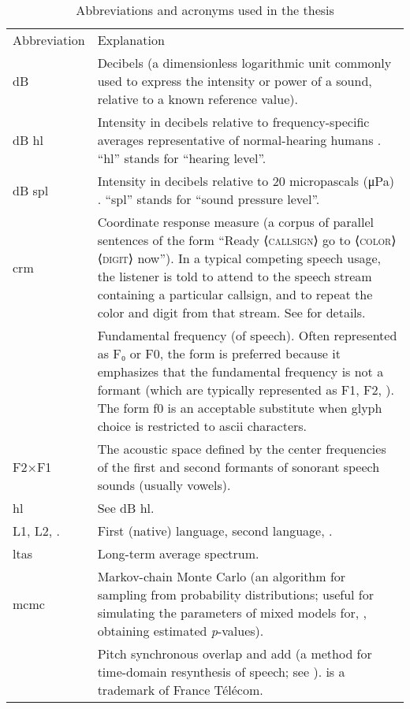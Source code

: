 \begin{table}
	\caption[Abbreviations and acronyms]{Abbreviations and acronyms used in the thesis \label{tab:Abbr}}
	\centering
	\begin{tabu} to \textwidth [c]{X[c m] X[5 m]}
		\toprule
		\everyrow{\midrule}
		\rowfont[c]{\bfseries} Abbreviation & Explanation\\
		{dB} & Decibels (a dimensionless logarithmic unit commonly used to express the intensity or power of a sound, relative to a known reference value).\\ 
		{dB \ac{hl}} & Intensity in decibels relative to frequency-specific averages representative of normal-hearing humans .  “\ac{hl}” stands for “hearing level”.\\
		{dB \ac{spl}} & Intensity in decibels relative to 20 micropascals (μPa) .  “\ac{spl}” stands for “sound pressure level”.\\
		\ac{crm} & Coordinate response measure (a corpus of parallel sentences of the form “Ready ⟨\textsc{callsign}⟩ go to ⟨\textsc{color}⟩ ⟨\textsc{digit}⟩ now”).  In a typical competing speech usage, the listener is told to attend to the speech stream containing a particular callsign, and to repeat the color and digit from that stream.  See \citet{BoliaEtAl2000} for details.\\
		\fo & Fundamental frequency (of speech).  Often represented as F₀ or F0, the form \fo{} is preferred because it emphasizes that the fundamental frequency is not a formant (which are typically represented as F1, F2, \etc).  The form f0 is an acceptable substitute when glyph choice is restricted to \ac{ascii} characters.\\
		F2×F1 & The acoustic space defined by the center frequencies of the first and second formants of sonorant speech sounds (usually vowels).\\
		\ac{hl} & See {dB \ac{hl}}.\\
		L1, L2, \etc. & First (native) language, second language, \etc.\\
		\ac{ltas} & Long-term average spectrum.\\
		\ac{mcmc} & Markov-chain Monte Carlo (an algorithm for sampling from probability distributions; useful for simulating the parameters of mixed models for, \eg, obtaining estimated \textit{p}-values).\\
		\psola & Pitch synchronous overlap and add (a method for time-domain resynthesis of speech; see \citealt{CharpentierMoulines1988, MoulinesCharpentier1990}).  \psola{} is a trademark of France Télécom.\\

\end{tabu}
\end{table}
